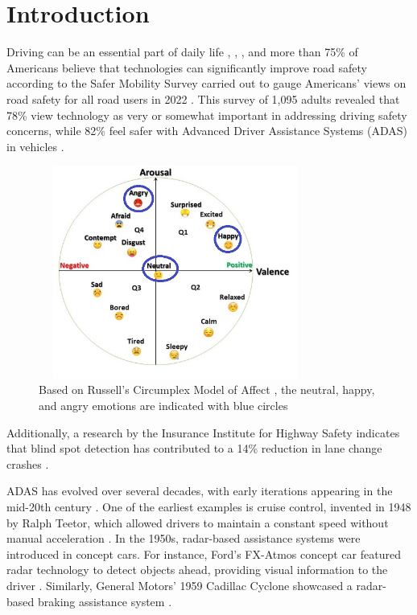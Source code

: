 \documentclass[sigconf]{acmart}
\begin{document}
\section{Introduction}
Driving can be an essential part of daily life \cite{10486424}, \cite{bengler2014three}, \cite{wang2021survey}, and more than 75\% of Americans believe that technologies can significantly improve road safety according to the Safer Mobility Survey carried out to gauge Americans' views on road safety for all road users in 2022 \cite{paveaeye2023}. This survey of 1,095 adults revealed that 78\% view technology as very or somewhat important in addressing driving safety concerns, while 82\% feel safer with Advanced Driver Assistance Systems (ADAS) in vehicles \cite{paveaeye2023}. 
\begin{figure}[h]
\caption{Based on Russell's Circumplex Model of Affect \cite{russell1980circumplex}, the neutral, happy, and angry emotions are indicated with blue circles\cite{kopalidis2024advances}}
\centering
\includegraphics[width=9cm, height=7cm]{images/ml_figure1.jpg}
\end{figure}
Additionally, a research by the Insurance Institute for Highway Safety indicates that blind spot detection has contributed to a 14\% reduction in lane change crashes \cite{paveaeye2023}.

ADAS has evolved over several decades, with early iterations appearing in the mid-20th century \cite{bengler2014three}. One of the earliest examples is cruise control, invented in 1948 by Ralph Teetor, which allowed drivers to maintain a constant speed without manual acceleration \cite{motorCities2021}. In the 1950s, radar-based assistance systems were introduced in concept cars. For instance, Ford's FX-Atmos concept car featured radar technology to detect objects ahead, providing visual information to the driver \cite{fordSuper03}. Similarly, General Motors' 1959 Cadillac Cyclone showcased a radar-based braking assistance system \cite{motorCities2021}. 
\end{document}
